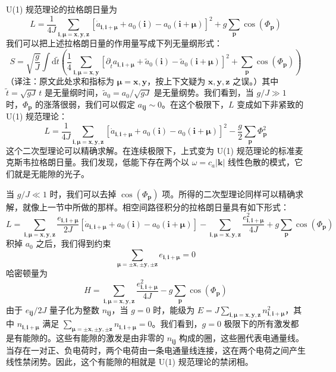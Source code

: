U(1) 规范理论的拉格朗日量为
\begin{equation*}
L=\frac{1}{4J}\sum_{\pmb{i},\pmb{\mu}=\pmb{x},\pmb{y},\pmb{z}}\left[\dot{a}_{\pmb{i},\pmb{i}+\pmb{\mu}}+a_{0}(\pmb{i})-a_{0}(\pmb{i}+\pmb{\mu})\right]^{2}+g\sum_{\pmb{p}}\cos(\Phi_{\pmb{p}})
\end{equation*}
我们可以把上述拉格朗日量的作用量写成下列无量纲形式：
\begin{equation*}
S=\sqrt{\frac{g}{J}}\int\mathrm{d}\tilde{t}\left(\frac{1}{4}\sum_{\pmb{i},\pmb{\mu}=\pmb{x},\pmb{y}}\left[\partial_{\tilde{t}}a_{\pmb{i},\pmb{i}+\pmb{\mu}}+\tilde{a}_{0}(\pmb{i})-\tilde{a}_{0}(\pmb{i}+\pmb{\mu})\right]^{2}+\sum_{\pmb{p}}\cos(\Phi_{\pmb{p}})\right)
\end{equation*}
（译注：原文此处求和指标为 $\pmb{\mu}=\pmb{x},\pmb{y}$，按上下文疑为 $\pmb{x},\pmb{y},\pmb{z}$ 之误。）其中 $\tilde{t}=\sqrt{gJ}\,t$ 是无量纲时间，$\tilde{a}_{0}=a_{0}/\sqrt{gJ}$ 是无量纲势。我们看到，当 $g/J\gg1$ 时，$\Phi_{\pmb{p}}$ 的涨落很弱，我们可以假定 $a_{\pmb{i}\pmb{j}}\sim0$。在这个极限下，$L$ 变成如下非紧致的 U(1) 规范理论：
\begin{equation*}
L=\frac{1}{4J}\sum_{\pmb{i},\pmb{\mu}=\pmb{x},\pmb{y},\pmb{z}}\left[\dot{a}_{\pmb{i},\pmb{i}+\pmb{\mu}}+a_{0}(\pmb{i})-a_{0}(\pmb{i}+\pmb{\mu})\right]^{2}-\frac{g}{2}\sum_{\pmb{p}}\Phi_{\pmb{p}}^{2}
\end{equation*}
这个二次型理论可以精确求解。在连续极限下，上式变为 U(1) 规范理论的标准麦克斯韦拉格朗日量。我们发现，低能下存在两个以 $\omega=c_{a}|\pmb{k}|$ 线性色散的模式，它们就是无能隙的光子。

当 $g/J\ll1$ 时，我们可以去掉 $\cos(\Phi_{\pmb{p}})$ 项。所得的二次型理论同样可以精确求解，就像上一节中所做的那样。相空间路径积分的拉格朗日量具有如下形式：
\begin{equation*}
L=\sum_{\pmb{i},\pmb{\mu}=\pmb{x},\pmb{y},\pmb{z}}\frac{e_{\pmb{i},\pmb{i}+\pmb{\mu}}}{2J}\left[\dot{a}_{\pmb{i},\pmb{i}+\pmb{\mu}}+a_{0}(\pmb{i})-a_{0}(\pmb{i}+\pmb{\mu})\right]-\sum_{\pmb{i},\pmb{\mu}=\pmb{x},\pmb{y},\pmb{z}}\frac{e_{\pmb{i},\pmb{i}+\pmb{\mu}}^{2}}{4J}+g\sum_{\pmb{p}}\cos(\Phi_{\pmb{p}})
\end{equation*}
积掉 $a_{0}$ 之后，我们得到约束
\begin{equation*}
\sum_{\pmb{\mu}=\pm\pmb{x},\pm\pmb{y},\pm\pmb{z}}e_{\pmb{i},\pmb{i}+\pmb{\mu}}=0
\end{equation*}
哈密顿量为
\begin{equation*}
H=\sum_{\pmb{i},\pmb{\mu}=\pmb{x},\pmb{y},\pmb{z}}\frac{e_{\pmb{i},\pmb{i}+\pmb{\mu}}^{2}}{4J}-g\sum_{\pmb{p}}\cos(\Phi_{\pmb{p}})
\end{equation*}
由于 $e_{\pmb{i}\pmb{j}}/2J$ 量子化为整数 $n_{\pmb{i}\pmb{j}}$，当 $g=0$ 时，能级为 $E=J\sum_{\pmb{i},\pmb{\mu}=\pmb{x},\pmb{y},\pmb{z}}n_{\pmb{i},\pmb{i}+\pmb{\mu}}^{2}$，其中 $n_{\pmb{i},\pmb{i}+\pmb{\mu}}$ 满足 $\sum_{\pmb{\mu}=\pm\pmb{x},\pm\pmb{y},\pm\pmb{z}}n_{\pmb{i},\pmb{i}+\pmb{\mu}}=0$。我们看到，$g=0$ 极限下的所有激发都是有能隙的。这些有能隙的激发是由非零的 $n_{\pmb{i}\pmb{j}}$ 构成的圈，这些圈代表电通量线。当存在一对正、负电荷时，两个电荷由一条电通量线连接，这在两个电荷之间产生线性禁闭势。因此，这个有能隙的相就是 U(1) 规范理论的禁闭相。

